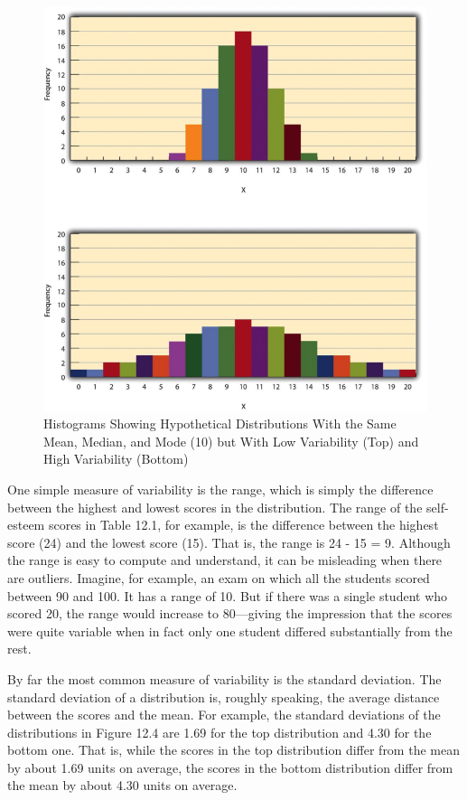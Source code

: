 \begin{figure}

\includegraphics[width=.7\linewidth]{figures/Fig124}
\caption{Histograms Showing Hypothetical Distributions With the Same Mean, Median, and Mode (10) but With Low Variability (Top) and High Variability (Bottom)}

\label{fig:variability}

\end{figure}

One simple measure of variability is the range, which is simply the difference between the highest and lowest
scores in the distribution. The range of the self-esteem scores in Table 12.1, for example, is the difference between the highest score (24) and the lowest score (15). That is, the range is 24 - 15 = 9. Although the range is easy to compute and understand, it can be misleading when there are outliers. Imagine, for example, an exam on which all the students scored between 90 and 100. It has a range of 10. But if there was a single student who scored 20, the range would increase to 80---giving the impression that the scores were quite variable when in fact only one student differed substantially from the rest.

By far the most common measure of variability is the standard deviation. The standard deviation of a distribution is, roughly speaking, the average distance between the scores and the mean. For example, the standard deviations of the distributions in Figure 12.4 are 1.69 for the top distribution and 4.30 for the bottom one. That is, while the scores in the top distribution differ from the mean by about 1.69 units on average, the scores in the bottom distribution differ from the mean by about 4.30 units on average.

